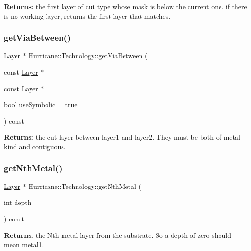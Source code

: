 {\bfseries Returns\+:} the first layer of cut type whose mask is below the current one. if there is no working layer, returns the first layer that matches. \mbox{\label{classHurricane_1_1Technology_a8209708bc594a307ea39f15a39bbf196}} 
\subsubsection{\texorpdfstring{get\+Via\+Between()}{getViaBetween()}}
{\footnotesize\ttfamily \mbox{\hyperlink{classHurricane_1_1Layer}{Layer}} $\ast$ Hurricane\+::\+Technology\+::get\+Via\+Between (\begin{DoxyParamCaption}\item[{const \mbox{\hyperlink{classHurricane_1_1Layer}{Layer}} $\ast$}]{,  }\item[{const \mbox{\hyperlink{classHurricane_1_1Layer}{Layer}} $\ast$}]{,  }\item[{bool}]{use\+Symbolic = {\ttfamily true} }\end{DoxyParamCaption}) const}

{\bfseries Returns\+:} the cut layer between {\ttfamily layer1} and {\ttfamily layer2}. They must be both of metal kind and contiguous. \mbox{\label{classHurricane_1_1Technology_a81a3f3e479aeb686c61a2d0fa2931f3b}} 
\subsubsection{\texorpdfstring{get\+Nth\+Metal()}{getNthMetal()}}
{\footnotesize\ttfamily \mbox{\hyperlink{classHurricane_1_1Layer}{Layer}} $\ast$ Hurricane\+::\+Technology\+::get\+Nth\+Metal (\begin{DoxyParamCaption}\item[{int}]{depth }\end{DoxyParamCaption}) const}

{\bfseries Returns\+:} the {\ttfamily Nth} metal layer from the substrate. So a {\ttfamily depth} of zero should mean {\ttfamily metal1}. \mbox{\label{classHurricane_1_1Technology_a247b75d5cbb85198cea9e5e609304cd0}} 
